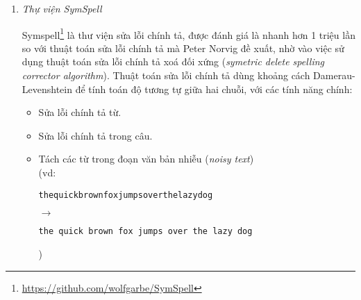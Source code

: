 \begin{enumerate}
    \item \textit{Thự viện SymSpell}

          Symspell\footnote{\url{https://github.com/wolfgarbe/SymSpell}} là thư viện sửa lỗi chính tả, được đánh giá là nhanh hơn 1 triệu lần so với thuật toán sửa lỗi chính tả mà Peter Norvig đề xuất, nhờ vào việc sử dụng thuật toán sửa lỗi chính tả xoá đối xứng (\textit{symetric delete spelling corrector algorithm}). Thuật toán sửa lỗi chính tả dùng khoảng cách Damerau-Levenshtein để tính toán độ tương tự giữa hai chuỗi, với các tính năng chính:
          \begin{itemize}
              \item Sửa lỗi chính tả từ.
              \item Sửa lỗi chính tả trong câu.
              \item Tách các từ trong đoạn văn bản nhiễu (\textit{noisy text})\\(vd: {\raggedright\texttt{thequickbrownfoxjumpsoverthelazydog}\par} $\to$ {\raggedright\texttt{the quick brown fox jumps over the lazy dog}\par})
          \end{itemize}
\end{enumerate}

